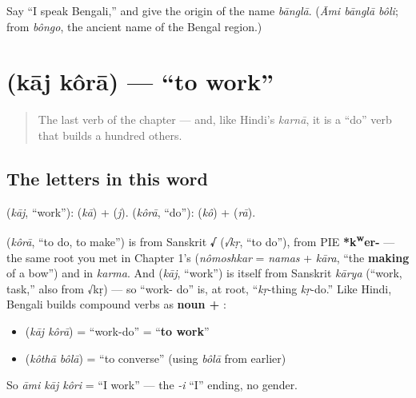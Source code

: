 \begin{tcolorbox}[breakable,colback=teal!4,colframe=teal!35!black,title={Before you move on}]
Say \textquotedblleft{}I speak Bengali,\textquotedblright{} and give the origin of the name \emph{bānglā}. (\emph{Āmi bānglā bôli}; from \emph{bôngo}, the ancient name of the Bengal region.)
\end{tcolorbox}
\section[kāj kôrā]{  (kāj kôrā) — \textquotedblleft{}to work\textquotedblright{}}

\label{lesson:BN-C05-kaj-kora}



\begin{quote}
The last verb of the chapter — and, like Hindi's \emph{karnā}, it is a \textquotedblleft{}do\textquotedblright{} verb that builds a hundred others.
\end{quote}

\subsection*{The letters in this word}
\textbf{} (\emph{kāj}, \textquotedblleft{}work\textquotedblright{}): \textbf{} (\emph{kā}) + \textbf{} (\emph{j}). \textbf{} (\emph{kôrā}, \textquotedblleft{}do\textquotedblright{}): \textbf{} (\emph{kô}) + \textbf{} (\emph{rā}).

\begin{cousinweb}
\textbf{} (\emph{kôrā}, \textquotedblleft{}to do, to make\textquotedblright{}) is from Sanskrit \textbf{√} (\emph{√kṛ}, \textquotedblleft{}to do\textquotedblright{}), from PIE \textbf{*k\textsuperscript{w}er-} — the same root you met in Chapter 1's \textbf{} (\emph{nômoshkar} = \emph{namas} + \emph{kāra}, \textquotedblleft{}the \textbf{making} of a bow\textquotedblright{}) and in \emph{karma}. And \textbf{} (\emph{kāj}, \textquotedblleft{}work\textquotedblright{}) is itself from Sanskrit \emph{kārya} (\textquotedblleft{}work, task,\textquotedblright{} also from √kṛ) — so \textquotedblleft{}work- do\textquotedblright{} is, at root, \textquotedblleft{}\emph{kṛ}-thing \emph{kṛ}-do.\textquotedblright{} Like Hindi, Bengali builds compound verbs as \textbf{noun + }:

\begin{itemize}
\raggedright
  \item \textbf{ } (\emph{kāj kôrā}) = \textquotedblleft{}work-do\textquotedblright{} = \textquotedblleft{}\textbf{to work}\textquotedblright{}
  \item \textbf{ } (\emph{kôthā bôlā}) = \textquotedblleft{}to converse\textquotedblright{} (using \emph{bôlā} from earlier)
\end{itemize}

So \emph{āmi kāj kôri} = \textquotedblleft{}I work\textquotedblright{} — the \emph{-i} \textquotedblleft{}I\textquotedblright{} ending, no gender.
\end{cousinweb}

